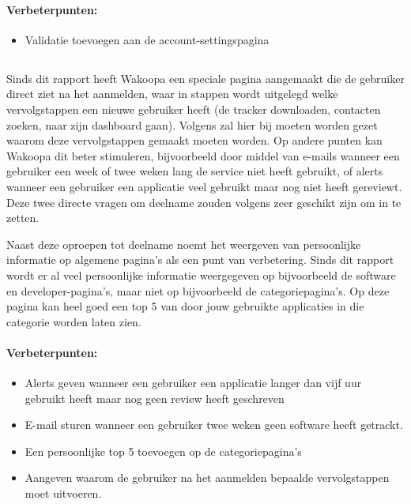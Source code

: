 \documentclass[a4paper, 10pt, pdftex]{report}
\begin{document}
      \paragraph{\textbf{Verbeterpunten:}}
      \begin{itemize}
        \item Validatie toevoegen aan de account-settingspagina
      \end{itemize}

    \subsection{\cite{Alfrink2008}}
    Sinds dit rapport heeft Wakoopa een speciale pagina aangemaakt die de gebruiker direct ziet na het aanmelden, waar in stappen wordt uitgelegd welke vervolgstappen een nieuwe gebruiker heeft (de tracker downloaden, contacten zoeken, naar zijn dashboard gaan). Volgens \citeauthor{Brouns2008} zal hier bij moeten worden gezet waarom deze vervolgstappen gemaakt moeten worden. Op andere punten kan Wakoopa dit beter stimuleren, bijvoorbeeld door middel van e-mails wanneer een gebruiker een week of twee weken lang de service niet heeft gebruikt, of alerts wanneer een gebruiker een applicatie veel gebruikt maar nog niet heeft gereviewt. Deze twee directe vragen om deelname zouden volgens \citeauthor{Alfrink2008} zeer geschikt zijn om in te zetten.

    Naast deze oproepen tot deelname noemt \citeauthor{Alfrink2008} het weergeven van persoonlijke informatie op algemene pagina's als een punt van verbetering. Sinds dit rapport wordt er al veel persoonlijke informatie weergegeven op bijvoorbeeld de software en developer-pagina's, maar niet op bijvoorbeeld de categoriepagina's. Op deze pagina kan heel goed een top 5 van door jouw gebruikte applicaties in die categorie worden laten zien.
    \paragraph{\textbf{Verbeterpunten:}}
      \begin{itemize}
        \item Alerts geven wanneer een gebruiker een applicatie langer dan vijf uur gebruikt heeft maar nog geen review heeft geschreven
        \item E-mail sturen wanneer een gebruiker twee weken geen software heeft getrackt.
        \item Een persoonlijke top 5 toevoegen op de categoriepagina's
        \item Aangeven waarom de gebruiker na het aanmelden bepaalde vervolgstappen moet uitvoeren.
      \end{itemize}
\end{document}
